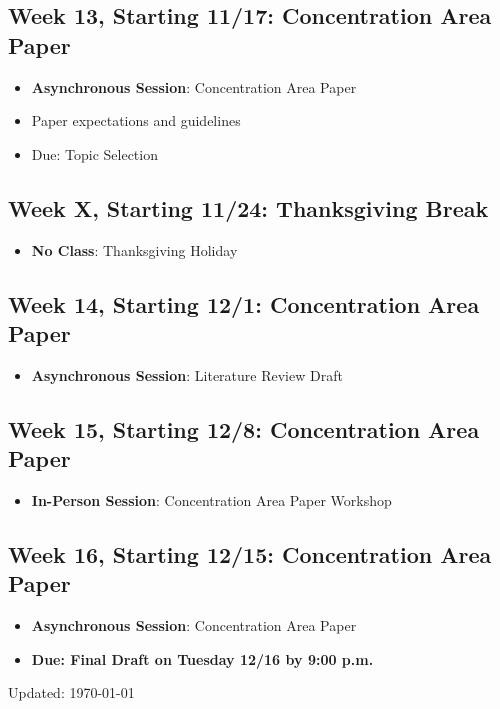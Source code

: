 \documentclass[12pt]{article}     %
\begin{document}
\subsection*{Week 13, Starting 11/17: Concentration Area Paper}
\begin{itemize}
    \item \textbf{Asynchronous Session}: Concentration Area Paper
    \item Paper expectations and guidelines 
    \item Due: Topic Selection
\end{itemize}

\subsection*{Week X, Starting 11/24: Thanksgiving Break}
\begin{itemize}
    \item \textbf{No Class}: Thanksgiving Holiday
\end{itemize}

\subsection*{Week 14, Starting 12/1: Concentration Area Paper}
\begin{itemize}
    \item \textbf{Asynchronous Session}: Literature Review Draft
\end{itemize}

\subsection*{Week 15, Starting 12/8: Concentration Area Paper}
\begin{itemize}
    \item \textbf{In-Person Session}: Concentration Area Paper Workshop
\end{itemize}

\subsection*{Week 16, Starting 12/15: Concentration Area Paper}
\begin{itemize}
    \item \textbf{Asynchronous Session}: Concentration Area Paper
    \item \textbf{Due: Final Draft on Tuesday 12/16 by 9:00 p.m.}
\end{itemize}


          


            \singlespace
            
            
\vspace{1cm}
\begin{flushright}
Updated: \today
\end{flushright}
\end{document}
